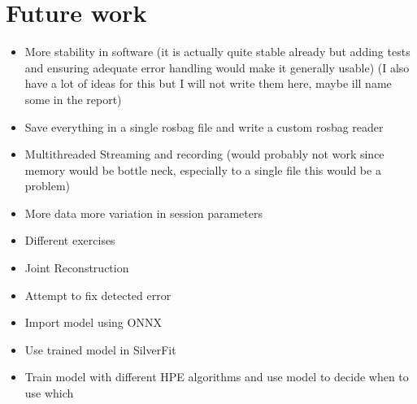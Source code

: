 \section{Future work}

\begin{itemize}
  \item More stability in software (it is actually quite stable already but adding tests and ensuring adequate error handling would make it generally usable) (I also have a lot of ideas for this but I will not write them here, maybe ill name some in the report)
  \item Save everything in a single rosbag file and write a custom rosbag reader
  \item Multithreaded Streaming and recording (would probably not work since memory would be bottle neck, especially to a single file this would be a problem)
  \item More data more variation in session parameters
  \item Different exercises
  \item Joint Reconstruction
  \item Attempt to fix detected error
  \item Import model using ONNX 
  \item Use trained model in SilverFit
  \item Train model with different HPE algorithms and use model to decide when to use which
\end{itemize}